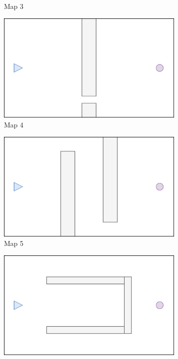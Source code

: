 \documentclass[../main.tex]{subfiles}
\begin{document}
\begin{figure}[H]
\begin{subfigure}[b]{0.24\textwidth}
		\caption*{Map 3}
		\label{fig:map3}
	\end{subfigure}
	\hfill
	\begin{subfigure}[b]{0.24\textwidth}
		\centering
		\includegraphics[width=\textwidth]{IMAGES/part3/map4.png}
		\caption*{Map 4}
		\label{fig:map4}
	\end{subfigure}
	\vfill
	\begin{subfigure}[b]{0.24\textwidth}
		\centering
		\includegraphics[width=\textwidth]{IMAGES/part3/map5.png}
		\caption*{Map 5}
		\label{fig:map5}
	\end{subfigure}
	\hfill
	\begin{subfigure}[b]{0.24\textwidth}
		\centering
		\includegraphics[width=\textwidth]{IMAGES/part3/map6.png}

\end{subfigure}
\end{figure}
\end{document}
